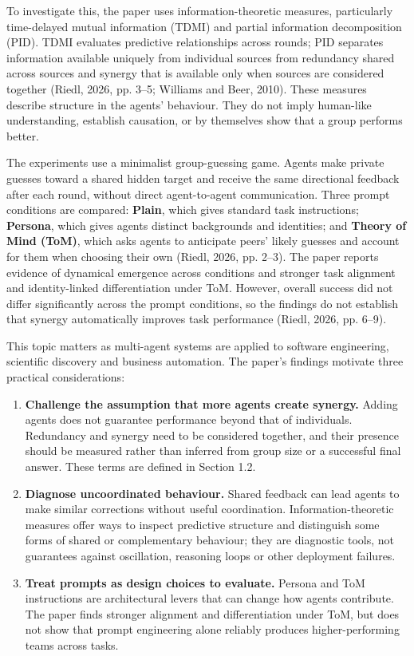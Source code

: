 \documentclass[12pt,a4paper,oneside]{report}
\begin{document}
To investigate this, the paper uses information-theoretic measures, particularly time-delayed mutual information (TDMI) and partial information decomposition (PID). TDMI evaluates predictive relationships across rounds; PID separates information available uniquely from individual sources from redundancy shared across sources and synergy that is available only when sources are considered together (Riedl, 2026, pp. 3–5; Williams and Beer, 2010). These measures describe structure in the agents’ behaviour. They do not imply human-like understanding, establish causation, or by themselves show that a group performs better.

The experiments use a minimalist group-guessing game. Agents make private guesses toward a shared hidden target and receive the same directional feedback after each round, without direct agent-to-agent communication. Three prompt conditions are compared: \textbf{Plain}, which gives standard task instructions; \textbf{Persona}, which gives agents distinct backgrounds and identities; and \textbf{Theory of Mind (ToM)}, which asks agents to anticipate peers’ likely guesses and account for them when choosing their own (Riedl, 2026, pp. 2–3). The paper reports evidence of dynamical emergence across conditions and stronger task alignment and identity-linked differentiation under ToM. However, overall success did not differ significantly across the prompt conditions, so the findings do not establish that synergy automatically improves task performance (Riedl, 2026, pp. 6–9).

This topic matters as multi-agent systems are applied to software engineering, scientific discovery and business automation. The paper’s findings motivate three practical considerations:
\begin{enumerate}
\item \textbf{Challenge the assumption that more agents create synergy.} Adding agents does not guarantee performance beyond that of individuals. Redundancy and synergy need to be considered together, and their presence should be measured rather than inferred from group size or a successful final answer. These terms are defined in Section 1.2.
\item \textbf{Diagnose uncoordinated behaviour.} Shared feedback can lead agents to make similar corrections without useful coordination. Information-theoretic measures offer ways to inspect predictive structure and distinguish some forms of shared or complementary behaviour; they are diagnostic tools, not guarantees against oscillation, reasoning loops or other deployment failures.
\item \textbf{Treat prompts as design choices to evaluate.} Persona and ToM instructions are architectural levers that can change how agents contribute. The paper finds stronger alignment and differentiation under ToM, but does not show that prompt engineering alone reliably produces higher-performing teams across tasks.
\end{enumerate}
\end{document}

